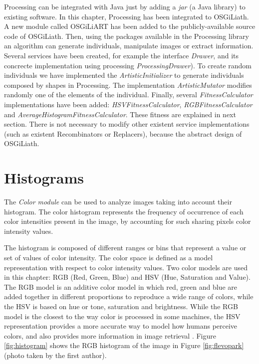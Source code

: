 Processing can be integrated with Java just by adding a {\em jar} (a Java library) to existing software. In this chapter, Processing has been integrated to OSGiLiath. A new module called OSGiLiART has been added to the publicly-available source code of OSGiLiath. Then, using the packages available in the Processing library an algorithm can generate individuals, manipulate images or extract information. Several services have been created, for example the interface {\em Drawer}, and its concrecte implementation using processing {\em ProcessingDrawer}). To create random individuals we have implemented the {\em ArtisticInitializer} to generate individuals composed by shapes in Processing. The implementation {\em ArtisticMutator} modifies randomly one of the elements of the individual. Finally, several {\em FitnessCalculator} implementations have been added: {\em HSVFitnessCalculator}, {\em RGBFitnessCalculator} and {\em AverageHistogramFitnessCalculator}. These fitness are explained in next section. There is not necessary to modify other existent service implementations (such as existent Recombinators or Replacers), because the abstract design of OSGiLiath.

\section{Histograms}
The {\em Color module} can be used to analyze images taking into account their histogram. The color histogram represents the frequency of occurrence of each color intensities present in the image, by accounting for such sharing pixels color intensity values.

The histogram is composed of different ranges or bins that represent a value or set of values of color intensity. The color space is defined as a model representation with respect to color intensity values. Two color models are used in this chapter: RGB (Red, Green, Blue) and HSV (Hue, Saturation and Value). The RGB model is an additive color model in which red, green and blue are added together in different proportions to reproduce a wide range of colors, while the HSV is based on hue or tone, saturation and brightness. While the RGB model is the closest to the way color is processed in some machines, the HSV representation provides a more accurate way to model how humans perceive colors, and also provides more information in image retrieval \cite{COLORDIFFERENCES}.
Figure \ref{fig:histogram} shows the RGB histogram of the image in Figure \ref{fig:flevopark} (photo taken by the first author).

